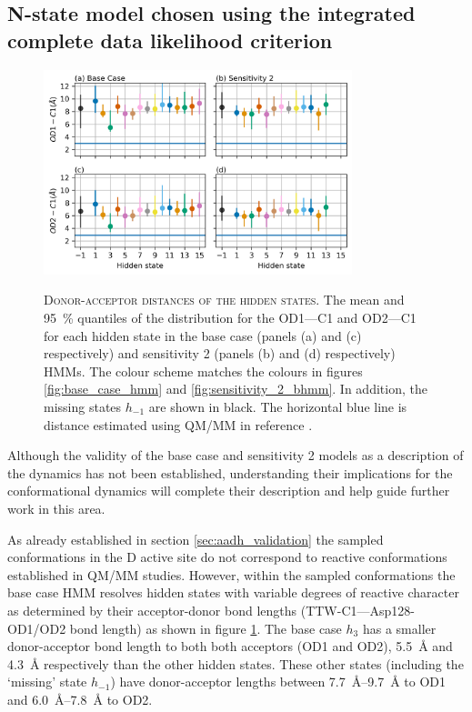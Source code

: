 \subsection{N-state model chosen using the integrated complete data likelihood criterion}

\begin{figure}
    \centering
    \caption[Donor-acceptor distances of the hidden states]{\textsc{Donor-acceptor distances of the hidden states}. The mean and \SI{95}{\percent} quantiles of the distribution for the OD1---C1 and OD2---C1  for each hidden state in the base case (panels (a) and (c) respectively) and sensitivity 2 (panels (b) and (d) respectively) HMMs. The colour scheme matches the colours in figures \ref{fig:base_case_hmm} and \ref{fig:sensitivity_2_bhmm}. In addition, the missing states $h_{-1}$ are shown in black. The horizontal blue line is distance estimated using QM/MM in reference \cite{ranaghanInitioQMMM2017}.}
    \includegraphics[width=0.8\textwidth]{chapters/aadh/figures/bond_dist_h_states.png}
    \label{fig:addh_bond_dist_h_state}
\end{figure}

Although the validity of the base case and sensitivity 2 models as a description of the dynamics has not been established, understanding their implications for the conformational dynamics will complete their description and help guide further work in this area. 

As already established in section \ref{sec:aadh_validation} the sampled conformations in the D active site do not correspond to reactive conformations established in QM/MM studies.  However, within the sampled conformations the base case HMM resolves hidden states with variable degrees of reactive character as determined  by their acceptor-donor bond lengths (TTW-C1---Asp128-OD1/OD2 bond length) as shown in figure \ref{fig:addh_bond_dist_h_state}. The base case $h_{3}$ has a smaller donor-acceptor bond length to both both acceptors (OD1 and OD2), \SI{5.5}{\angstrom} and \SI{4.3}{\angstrom} respectively than the other hidden states. These other states (including the `missing' state $h_{-1}$) have donor-acceptor lengths between \SIrange{7.7}{9.7}{\angstrom} to OD1 and \SIrange{6.0}{7.8}{\angstrom} to OD2. 

